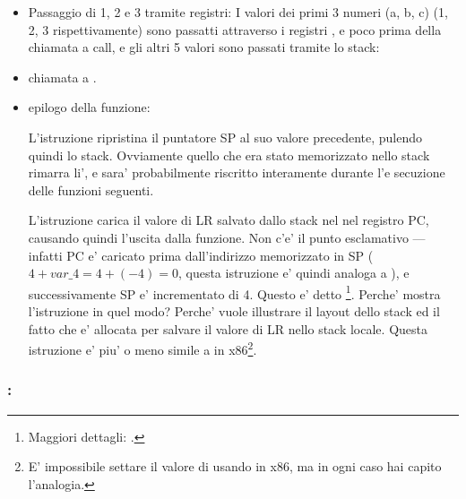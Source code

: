 \begin{itemize}
\item Passaggio di 1, 2 e 3 tramite registri:
I valori dei primi 3 numeri (a, b, c) (1, 2, 3 rispettivamente) sono passatti attraverso i registri
,  e 
poco prima della chiamata a \printf call, e gli altri 5 valori sono passati tramite lo stack:

\item chiamata a \printf.

\item epilogo della funzione:


L'istruzione  ripristina il puntatore \ac{SP} al suo valore precedente, pulendo quindi lo stack.
Ovviamente quello che era stato memorizzato nello stack rimarra li', e sara' probabilmente riscritto interamente durante l'e
secuzione delle funzioni seguenti.

L'istruzione  carica il valore di \ac{LR} salvato dallo stack nel nel registro \ac{PC}, causando quindi
l'uscita dalla funzione.
Non c'e' il punto esclamativo ---infatti \ac{PC} e' caricato prima dall'indirizzo memorizzato in \ac{SP} ($4+var\_4=4+(-4)=0$, questa istruzione e' quindi analoga a ), e successivamente \ac{SP} e' incrementato di 4.
Questo e' detto \footnote{Maggiori dettagli: .}.
Perche' \IDA mostra l'istruzione in quel modo?
Perche' vuole illustrare il layout dello stack ed il fatto che  e' allocata per salvare il valore di \ac{LR} nello stack locale.
Questa istruzione e' piu' o meno simile a  in x86\footnote{E' impossibile settare il valore di  usando \POP in x86, ma in ogni caso hai capito l'analogia.}.

\end{itemize}

\subsubsection{\OptimizingKeilVI: \ThumbMode}

